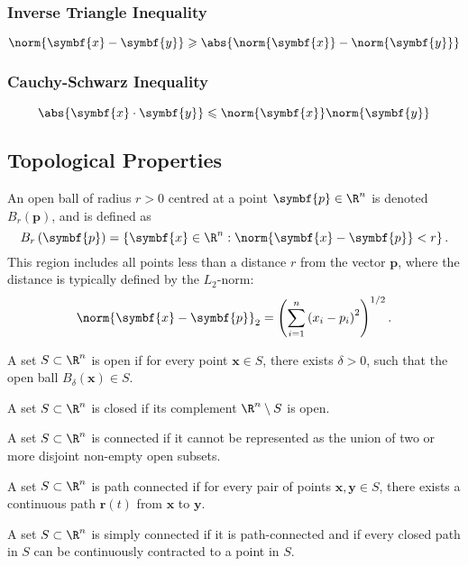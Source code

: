 \documentclass{article}
\begin{document}
\subsubsection{Inverse Triangle Inequality}
\begin{equation*}
    \norm{\symbf{x} - \symbf{y}} \geqslant \abs{\norm{\symbf{x}} - \norm{\symbf{y}}}
\end{equation*}
\subsubsection{Cauchy-Schwarz Inequality}
\begin{equation*}
    \abs{\symbf{x} \cdot \symbf{y}} \leqslant \norm{\symbf{x}} \norm{\symbf{y}}
\end{equation*}
\subsection{Topological Properties}
\begin{definition}
    An open ball of radius \(r > 0\) centred at a
    point \(\symbf{p} \in \R^n\) is denoted \(B_r\left( \symbf{p}
    \right)\), and is defined as
    \begin{equation*}
        B_r\left( \symbf{p} \right) = \left\{ \symbf{x} \in \R^n : \norm{\symbf{x} - \symbf{p}} < r \right\}.
    \end{equation*}
    This region includes all points less than a distance \(r\) from the
    vector \(\symbf{p}\), where the distance is typically defined by the
    \(L_2\)-norm:
    \begin{equation*}
        \norm{\symbf{x} - \symbf{p}}_2 = \left( \sum_{i=1}^n \left( x_i - p_i \right)^2 \right)^{1/2}.
    \end{equation*}
\end{definition}
\begin{definition}
    A set \(S \subset \R^n\) is open if for every point \(\symbf{x} \in S\),
    there exists \(\delta > 0\), such that the open ball
    \(B_{\delta}\left( \symbf{x} \right) \in S\).
\end{definition}
\begin{definition}
    A set \(S \subset \R^n\) is closed if its complement
    \(\R^n \setminus S\) is open.
\end{definition}
\begin{definition}
    A set \(S \subset \R^n\) is connected if it cannot be represented as
    the union of two or more disjoint non-empty open subsets.
\end{definition}
\begin{definition}
    A set \(S \subset \R^n\) is path connected if for every pair of
    points \(\symbf{x}, \symbf{y} \in S\), there exists a continuous
    path \(\symbf{r}\left( t \right)\) from \(\symbf{x}\) to \(\symbf{y}\).
\end{definition}
\begin{definition}
    A set \(S \subset \R^n\) is simply connected if it is path-connected
    and if every closed path in \(S\) can be continuously contracted to
    a point in \(S\).
\end{definition}
\end{document}
